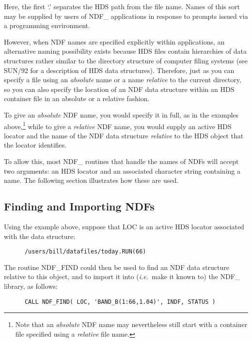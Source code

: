 \documentclass[twoside,11pt]{article}
\newcommand{\htmlref}[2]{#1}
\newcommand{\xref}[3]{#1}
\newcommand{\xlabel}[1]{}
\newcommand{\st}[1]{{\em{#1}}}
\begin{document}
Here, the first `.' separates the HDS path from the file name. Names
of this sort may be supplied by users of NDF\_ applications in
response to prompts issued via a programming environment.

However, when NDF names are specified explicitly within applications,
an alternative naming possibility exists because HDS files contain
hierarchies of data structures rather similar to the directory
structure of computer filing systems (see
\xref{SUN/92}{sun92}{introduction} for a description of HDS data
structures).  Therefore, just as you can specify a file using an
\st{absolute\/} name or a name \st{relative\/} to the current
directory, 
so you can also specify the location of an NDF data structure within
an HDS container file in an absolute or a relative fashion.

To give an \st{absolute\/} NDF name, you would specify it in full, as
in the examples above,\footnote{Note that an \st{absolute\/} NDF name
may nevertheless still start with a container file specified using a
\st{relative\/} file name.} while to give a \st{relative\/} NDF
name, you would supply an active \xref{HDS
locator}{sun92}{using_locators} and the name of the NDF data structure
\st{relative\/} to the HDS object that the locator identifies.

To allow this, most NDF\_ routines that handle the names of NDFs will
accept two arguments: an HDS locator and an associated character
string containing a name. The following section illustrates how these
are used.

\subsection{\xlabel{finding_and_importing_ndfs}\label{ss:findingandimporting}Finding and Importing NDFs}

Using the example above, suppose that LOC is an active \xref{HDS
locator}{sun92}{using_locators} associated with the data structure:

\small
\begin{verbatim}
      /users/bill/datafiles/today.RUN(66)
\end{verbatim}
\normalsize

The routine \htmlref{NDF\_FIND}{NDF_FIND} could then be used to find an NDF data structure
relative to this object, and to import it into (\st{i.e.}\ make it
known to) the NDF\_ library, as follows:

\small
\begin{verbatim}
      CALL NDF_FIND( LOC, 'BAND_B(1:66,1.04)', INDF, STATUS )
\end{verbatim}
\normalsize
\end{document}
